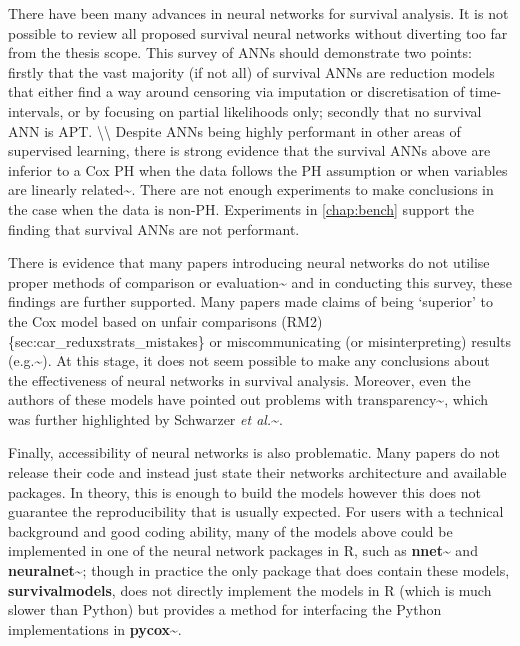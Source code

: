 \documentclass[
  letterpaper,
]{scrbook}
\theoremstyle{plain}
\theoremstyle{definition}
\theoremstyle{remark}
\begin{document}
There have been many advances in neural networks for survival analysis.
It is not possible to review all proposed survival neural networks
without diverting too far from the thesis scope. This survey of ANNs
should demonstrate two points: firstly that the vast majority (if not
all) of survival ANNs are reduction models that either find a way around
censoring via imputation or discretisation of time-intervals, or by
focusing on partial likelihoods only; secondly that no survival ANN is
APT. \textbackslash\textbackslash{} Despite ANNs being highly performant
in other areas of supervised learning, there is strong evidence that the
survival ANNs above are inferior to a Cox PH when the data follows the
PH assumption or when variables are linearly
related\textasciitilde{}\cite{Gensheimer2018, Luxhoj1997, Ohno-Machado1997, Puddu2012, Xiang2000, Yang2010, Yasodhara2018, Zhao2020}.
There are not enough experiments to make conclusions in the case when
the data is non-PH. Experiments in \ref{chap:bench} support the finding
that survival ANNs are not performant.

There is evidence that many papers introducing neural networks do not
utilise proper methods of comparison or
evaluation\textasciitilde{}\cite{Kiraly2018d} and in conducting this
survey, these findings are further supported. Many papers made claims of
being `superior' to the Cox model based on unfair comparisons
(RM2)\{sec:car\_reduxstrats\_mistakes\} or miscommunicating (or
misinterpreting) results (e.g.\textasciitilde{}\cite{Fotso2018}). At
this stage, it does not seem possible to make any conclusions about the
effectiveness of neural networks in survival analysis. Moreover, even
the authors of these models have pointed out problems with
transparency\textasciitilde{}\cite{Biganzoli2009, Liestol1994}, which
was further highlighted by Schwarzer
\textit{et al.}\textasciitilde{}\cite{Schwarzer2000}.

Finally, accessibility of neural networks is also problematic. Many
papers do not release their code and instead just state their networks
architecture and available packages. In theory, this is enough to build
the models however this does not guarantee the reproducibility that is
usually expected. For users with a technical background and good coding
ability, many of the models above could be implemented in one of the
neural network packages in \textsf{R}, such as
\textbf{nnet}\textasciitilde{}\cite{pkgnnet} and
\textbf{neuralnet}\textasciitilde{}\cite{pkgneuralnet}; though in
practice the only package that does contain these models,
\textbf{survivalmodels}, does not directly implement the models in
\textsf{R} (which is much slower than Python) but provides a method for
interfacing the Python implementations in
\textbf{pycox}\textasciitilde{}\cite{pkgpycox}.
\end{document}
